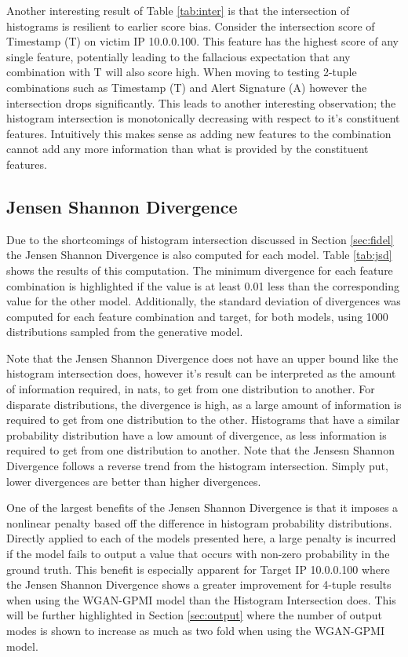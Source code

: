 Another interesting result of Table \ref{tab:inter} is that the intersection of histograms is resilient to earlier score bias. Consider the intersection score of Timestamp (T) on victim IP 10.0.0.100. This feature has the highest score of any single feature, potentially leading to the fallacious expectation that any combination with T will also score high. When moving to testing 2-tuple combinations such as Timestamp (T) and Alert Signature (A) however the intersection drops significantly. This leads to another interesting observation; the histogram intersection is monotonically decreasing with respect to it's constituent features. Intuitively this makes sense as adding new features to the combination cannot add any more information than what is provided by the constituent features.

\subsection{Jensen Shannon Divergence}

Due to the shortcomings of histogram intersection discussed in Section \ref{sec:fidel} the Jensen Shannon Divergence is also computed for each model. Table \ref{tab:jsd} shows the results of this computation. The minimum divergence for each feature combination is highlighted if the value is at least 0.01 less than the corresponding value for the other model. Additionally, the standard deviation of divergences was computed for each feature combination and target, for both models, using 1000 distributions sampled from the generative model.

Note that the Jensen Shannon Divergence does not have an upper bound like the histogram intersection does, however it's result can be interpreted as the amount of information required, in nats, to get from one distribution to another. For disparate distributions, the divergence is high, as a large amount of information is required to get from one distribution to the other. Histograms that have a similar probability distribution have a low amount of divergence, as less information is required to get from one distribution to another. Note that the Jensesn Shannon Divergence follows a reverse trend from the histogram intersection. Simply put, lower divergences are better than higher divergences. 

One of the largest benefits of the Jensen Shannon Divergence is that it imposes a nonlinear penalty based off the difference in histogram probability distributions. Directly applied to each of the models presented here, a large penalty is incurred if the model fails to output a value that occurs with non-zero probability in the ground truth. This benefit is especially apparent for Target IP 10.0.0.100 where the Jensen Shannon Divergence shows a greater improvement for  4-tuple results when using the WGAN-GPMI model than the Histogram Intersection does. This will be further highlighted in Section \ref{sec:output} where the number of output modes is shown to increase as much as two fold when using the WGAN-GPMI model. 

